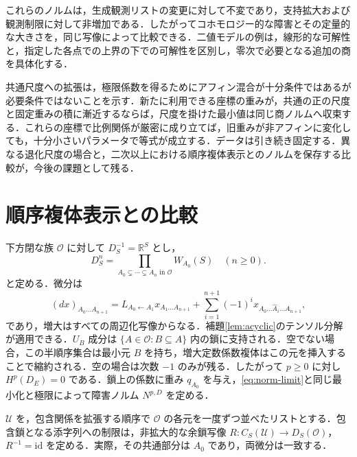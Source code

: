 \documentclass[11pt,a4paper]{article}
\numberwithin{equation}{section}
\theoremstyle{japanese}
\theoremstyle{remark}
\newcommand{\R}{\mathbb R}
\newcommand{\OO}{\mathcal O}
\newcommand{\id}{\mathrm{id}}
\begin{document}
これらのノルムは，生成観測リストの変更に対して不変であり，支持拡大および観測制限に対して非増加である．したがってコホモロジー的な障害とその定量的な大きさを，同じ写像によって比較できる．二値モデルの例は，線形的な可解性と，指定した各点での上界の下での可解性を区別し，零次で必要となる追加の商を具体化する．

共通尺度への拡張は，極限係数を得るためにアフィン混合が十分条件ではあるが必要条件ではないことを示す．新たに利用できる座標の重みが，共通の正の尺度と固定重みの積に漸近するならば，尺度を掛けた最小値は同じ商ノルムへ収束する．これらの座標で比例関係が厳密に成り立てば，旧重みが非アフィンに変化しても，十分小さいパラメータで等式が成立する．データは引き続き固定する．異なる退化尺度の場合と，二次以上における順序複体表示とのノルムを保存する比較が，今後の課題として残る．

\appendix
\section{順序複体表示との比較}\label{app:order}
下方閉な族 $\OO$ に対して $D_S^{-1}=\R^S$ とし，
\[
 D_S^n=\prod_{A_0\subsetneq\cdots\subsetneq A_n\text{ in }\OO}W_{A_0}(S)\quad(n\ge0).
\]
と定める．微分は
\begin{equation}\label{eq:order-differential}
 (d x)_{A_0\ldots A_{n+1}}
 =L_{A_0\leftarrow A_1}x_{A_1\ldots A_{n+1}}
 +\sum_{i=1}^{n+1}(-1)^i x_{A_0\ldots\widehat A_i\ldots A_{n+1}},
\end{equation}
であり，増大はすべての周辺化写像からなる．補題\ref{lem:acyclic}のテンソル分解が適用できる．$U_B$ 成分は $\{A\in\OO:B\subseteq A\}$ 内の鎖に支持される．空でない場合，この半順序集合は最小元 $B$ を持ち，増大定数係数複体はこの元を挿入することで縮約される．空の場合は次数 $-1$ のみが残る．したがって $p\ge0$ に対し $H^p(D_E)=0$ である．鎖上の係数に重み $q_{A_0}$ を与え，\eqref{eq:norm-limit}と同じ最小化と極限によって障害ノルム $N^{p,D}$ を定める．

$\mathcal U$ を，包含関係を拡張する順序で $\OO$ の各元を一度ずつ並べたリストとする．包含鎖となる添字列への制限は，非拡大的な余鎖写像 $R:C_S(\mathcal U)\to D_S(\OO)$，$R^{-1}=\id$ を定める．実際，その共通部分は $A_0$ であり，両微分は一致する．
\end{document}
